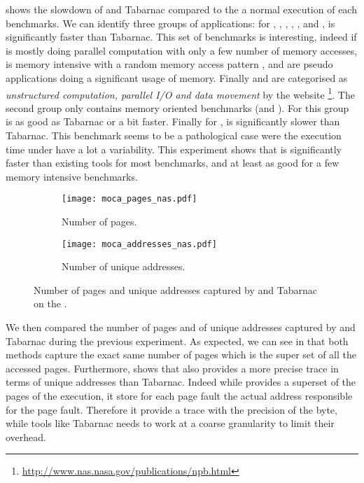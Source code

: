  shows the slowdown of \Moca and Tabarnac compared to the
a normal execution of each benchmarks. We can identify three groups of
applications:  for \BT, \DC, \EP, \IS, \LU, \SP and \UA, \Moca is
significantly faster than Tabarnac. This set of benchmarks is interesting,
indeed if \EP is mostly doing parallel computation with only a few number of
memory accesses, \IS is memory intensive with a random memory access pattern
\BT, \LU and \SP are pseudo applications doing a significant usage of memory.
Finally \DC and \UA are categorised as \emph{unstructured computation,
parallel I/O and data movement} by the \NPB website
\footnote{\url{http://www.nas.nasa.gov/publications/npb.html}}. The second
group only contains memory oriented benchmarks (\CG and \FT). For this group
\Moca is as good as Tabarnac or a bit faster. Finally for \MG, \Moca is
significantly slower than Tabarnac. This benchmark seems to be a pathological
case were the execution time under \Moca have a lot a variability.
This experiment shows that \Moca is significantly faster than existing tools
for most benchmarks, and at least as good for a few memory intensive
benchmarks.

\begin{figure}[htb]
    \centering
    \begin{subfigure}{\linewidth}
        \texttt{[image: moca\_pages\_nas.pdf]}
        \caption{Number of pages.}
        \label{fig:pages}
    \end{subfigure}
    \begin{subfigure}{\linewidth}
        \texttt{[image: moca\_addresses\_nas.pdf]}
        \caption{Number of unique addresses.}
        \label{fig:addr}
    \end{subfigure}
    \caption{Number of pages and unique addresses captured by \Moca and Tabarnac
    on the \NPB.}
    \label{fig:pages-addr}
\end{figure}

We then compared the number of pages and of unique addresses captured by \Moca
and Tabarnac during the previous experiment. As expected, we can see in
 that both methods capture the exact same number of
pages which is the super set of all the accessed pages. Furthermore,
 shows that \Moca also provides a more precise trace in
terms of unique addresses than Tabarnac. Indeed while \Moca provides a
superset of the pages of the execution, it store for each page fault the
actual address responsible for the page fault. Therefore it provide a trace
with the precision of the byte, while tools like Tabarnac needs to work at a
coarse granularity to limit their overhead.

